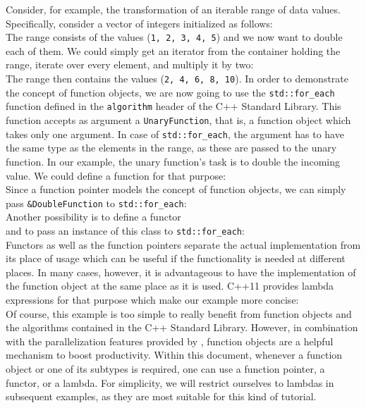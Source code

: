 Consider, for example, the transformation of an iterable range of data values. Specifically, consider a vector of integers initialized as follows:
%
\\
%
The range consists of the values (\lstinline|1, 2, 3, 4, 5|) and we now want to double each of them. We could simply get an iterator from the container holding the range, iterate over every element, and multiply it by two:
%
\\
%
The range then contains the values (\lstinline|2, 4, 6, 8, 10|). In order to demonstrate the concept of function objects, we are now going to use the \lstinline|std::for_each| function defined in the \lstinline|algorithm| header of the C++ Standard Library. This function accepts as argument a \lstinline|UnaryFunction|, that is, a function object which takes only one argument. In case of \lstinline|std::for_each|, the argument has to have the same type as the elements in the range, as these are passed to the unary function. In our example, the unary function's task is to double the incoming value. We could define a function for that purpose:
%
\\
%
Since a function pointer models the concept of function objects, we can simply pass \lstinline|&DoubleFunction| to \lstinline|std::for_each|:
%
\\
%
Another possibility is to define a functor
%
\\
%
and to pass an instance of this class to \lstinline|std::for_each|:
%
\\
%
Functors as well as the function pointers separate the actual implementation from its place of usage which can be useful if the functionality is needed at different places. In many cases, however, it is advantageous to have the implementation of the function object at the same place as it is used. C++11 provides lambda expressions for that purpose which make our example more concise:
%
\\
%
Of course, this example is too simple to really benefit from function objects and the algorithms contained in the C++ Standard Library. However, in combination with the parallelization features provided by \embb, function objects are a helpful mechanism to boost productivity. Within this document, whenever a function object or one of its subtypes is required, one can use a function pointer, a functor, or a lambda. For simplicity, we will restrict ourselves to lambdas in subsequent examples, as they are most suitable for this kind of tutorial.
